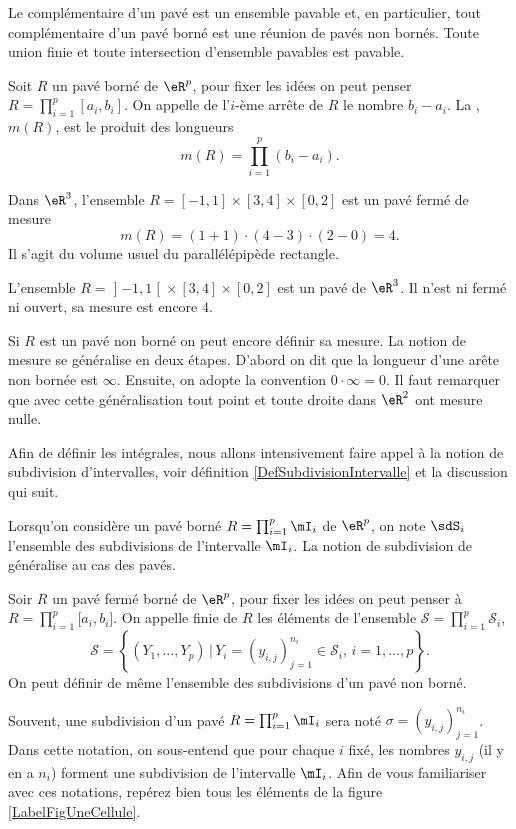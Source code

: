 Le complémentaire d'un pavé est  un ensemble pavable et, en particulier, tout complémentaire d'un pavé borné est une réunion de  pavés non bornés. Toute union finie et toute intersection d'ensemble pavables est pavable.    
\begin{definition}
	Soit $R$ un pavé borné de $\eR^p$, pour fixer les idées on peut penser $R=\prod_{i=1}^{p}[a_i,b_i]$. On appelle  de l'$i$-ème arrête de $R$ le nombre $b_i-a_i$. La , $m(R)$, est le produit des longueurs 
\[
m(R)=\prod_{i=1}^{p}(b_i-a_i).
\] 
\end{definition}
\begin{example}
  Dans $\eR^3$, l'ensemble $R=[-1,1]\times[3,4]\times[0,2]$ est un pavé fermé de mesure 
\[
m(R)= (1+1)\cdot(4-3)\cdot(2-0)=4.
\] 
Il s'agit du volume usuel du parallélépipède rectangle.
\end{example}
\begin{example}
 L'ensemble $R=\mathopen] -1 , 1 \mathclose[\times[3,4]\times[0,2]$ est un pavé de $\eR^3$. Il n'est ni fermé ni ouvert, sa mesure est encore $4$.  
\end{example}
Si $R$ est un pavé non borné on peut encore définir sa mesure. La notion de mesure se généralise en deux étapes. D'abord on dit que la longueur d'une arête non bornée est $\infty$. Ensuite, on adopte la convention $0\cdot \infty=0$. Il faut remarquer que avec cette généralisation tout point et toute droite dans $\eR^2$ ont mesure nulle.  


Afin de définir les intégrales, nous allons intensivement faire appel à la notion de subdivision d'intervalles, voir définition \ref{DefSubdivisionIntervalle} et la discussion qui suit.

Lorsqu'on considère un pavé borné $R=\prod_{i=1}^p\mI_i$ de $\eR^p$, on note $\sdS_i$ l'ensemble des subdivisions de l'intervalle $\mI_i$. La notion de subdivision de généralise au cas des pavés.
\begin{definition}
	Soir $R$ un pavé fermé borné de $\eR^p$, pour fixer les idées on peut penser à $R=\prod_{i=1}^p\mathopen[ a_i , b_i \mathclose]$. On appelle  finie de $R$ les éléments de l'ensemble $\mathcal{S}=\prod_{i=1}^{p}\mathcal{S}_i$, 
\[
\mathcal{S}=\left\{ (Y_{1},\ldots, Y_{p})\,\big\vert\, Y_{i}=(y_{i,j})_{j=1}^{n_i}\in\mathcal{S}_i,\, i=1,\ldots,p\right\}.
\]
On peut définir de même l'ensemble des subdivisions d'un pavé non borné. 
 \end{definition}
 Souvent, une subdivision d'un pavé $R=\prod_{i=1}^p\mI_i$ sera noté $\sigma=(y_{i,j})_{j=1}^{n_i}$. Dans cette notation, on sous-entend que pour chaque $i$ fixé, les nombres $y_{i,j}$ (il y en a $n_i$) forment une subdivision de l'intervalle $\mI_i$. Afin de vous familiariser avec ces notations, repérez bien tous les éléments de la figure \ref{LabelFigUneCellule}.
\newcommand{\CaptionFigUneCellule}{Une cellule d'une subdivision d'un pavé de $\eR^2$. La cellule grisée est $R_{(4,2)}$.}


